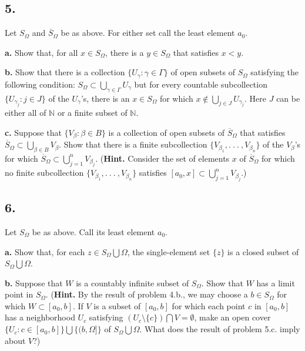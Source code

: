 \documentclass{amsart}
\theoremstyle{plain}
\theoremstyle{definition}
\theoremstyle{remark}
\begin{document}
\vspace{.15in}
\noindent
\subsection*{5.} Let $S_{\Omega}$ and $\overline{S} _{\Omega}$ be as above. For either set call the least element $a_0$. 

\vspace{.1in}
{\bfseries a.} Show that, for all $x\in S_{\Omega}$, there is a $y\in S_{\Omega}$ that satisfies $x < y$.

\vspace{.1in}
{\bfseries b.}  Show that there is a collection $\{ U_{\gamma} : \gamma \in \Gamma \}$ of open subsets of $S_{\Omega}$ satisfying the following condition: $S_{\Omega} \subset \bigcup _{\gamma \in \Gamma} U_{\gamma}$ but for every countable subcollection $\{ U_{\gamma _j} : j\in J \} $ of the $U_{\gamma}$'s, there is an $x\in S_{\Omega}$ for which $x\notin \bigcup _{j\in J} U_{\gamma _j}$.  Here $J$ can be either all of $\mathbb N$ or a finite subset of $\mathbb N$. 

\vspace{.1in}
{\bfseries c.} Suppose that $\{ V_{\beta} : \beta \in B \}$ is a collection of open subsets of $\overline{S} _{\Omega}$ that satisfies $\overline{S} _{\Omega} \subset \bigcup _{\beta \in B} V_{\beta}$. Show that there is a finite subcollection  $\{ V_{\beta _1} , .\ .\ .\ , V_{\beta _n}\}$ of the 
$V_{\beta}$'s for which $\overline{S} _{\Omega} \subset \bigcup _{j = 1}^nV_{\beta _j}$. ({\bfseries Hint.} Consider the set of elements $x$ of $\overline{S} _{\Omega}$ for which no finite subcollection  $\{ V_{\beta _1} , .\ .\ .\ , V_{\beta _n}\}$ satisfies $[a_0 , x]  \subset \bigcup _{j = 1}^nV_{\beta _j}$.)

\vspace{.15in}

\noindent
\subsection*{6.}  Let $S_{\Omega}$ be as above. Call its least element $a_0$. 

\vspace{.1in}
{\bfseries a.} Show that, for each $z\in S_{\Omega} \bigcup \Omega$, the single-element set $\{ z\}$ is a closed subset of $S_{\Omega} \bigcup \Omega$.

\vspace{.1in}
{\bfseries b.}  Suppose that $W$ is a countably infinite subset of $S_{\Omega}$. Show that $W$ has a limit point in $S_{\Omega}$. ({\bf Hint.} By the result of problem 4.b., we may choose a $b\in S_{\Omega}$ for which $W\subset [a_0,b]$. If $V$ is a subset of $[a_0,b]$ for which each point $c$ in $[a_0,b]$ has a neighborhood $U_c$ satisfying $(U_c\setminus \{c\} )\bigcap V = \emptyset$, make an open cover $\{ U_c : c \in [a_0,b]\} \bigcup \{ (b, \Omega ]\}$ of $S_{\Omega} \bigcup \Omega$. What does the result of problem 5.c. imply about $V$?)
\end{document}
